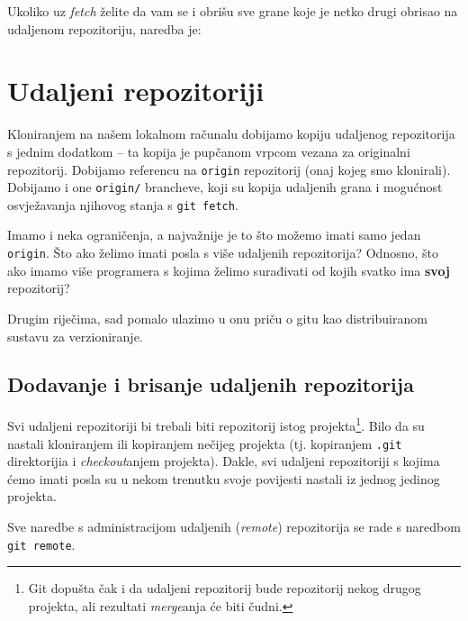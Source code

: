 Ukoliko uz \emph{fetch} želite da vam se i obrišu sve grane koje je netko drugi obrisao na udaljenom repozitoriju, naredba je:


%

\section*{Udaljeni repozitoriji}

Kloniranjem na našem lokalnom računalu dobijamo kopiju udaljenog repozitorija s jednim dodatkom -- ta kopija je pupčanom vrpcom vezana za originalni repozitorij.
Dobijamo referencu na \verb+origin+ repozitorij (onaj kojeg smo klonirali).
Dobijamo i one \verb+origin/+ brancheve, koji su kopija udaljenih grana i mogućnost osvježavanja njihovog stanja s \verb+git fetch+.

Imamo i neka ograničenja, a najvažnije je to što možemo imati samo jedan \verb+origin+.
Što ako želimo imati posla s više udaljenih repozitorija?
Odnosno, što ako imamo više programera s kojima želimo surađivati od kojih svatko ima \textbf{svoj} repozitorij?

Drugim riječima, sad pomalo ulazimo u onu priču o gitu kao distribuiranom sustavu za verzioniranje.

\subsection*{Dodavanje i brisanje udaljenih repozitorija}

Svi udaljeni repozitoriji bi trebali biti repozitorij istog projekta\footnote{Git dopušta čak i da udaljeni repozitorij bude repozitorij nekog drugog projekta, ali rezultati \emph{merge}anja će biti čudni.}. 
Bilo da su nastali kloniranjem ili kopiranjem nečijeg projekta (tj. kopiranjem \verb+.git+ direktorijia i \emph{checkout}anjem projekta).
Dakle, svi udaljeni repozitoriji s kojima ćemo imati posla su u nekom trenutku svoje povijesti nastali iz jednog jedinog projekta.

Sve naredbe s administracijom udaljenih (\emph{remote}) repozitorija se rade s naredbom \\ \verb+git remote+.

